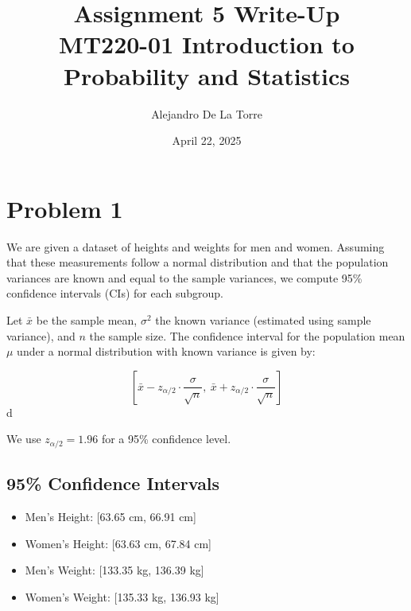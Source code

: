 \documentclass[12pt]{article}
\title{Assignment 5 Write-Up \\ MT220-01 Introduction to Probability and Statistics}
\author{Alejandro De La Torre}
\date{April 22, 2025}
\begin{document}
\maketitle

\section*{Problem 1}

We are given a dataset of heights and weights for men and women. Assuming that these measurements follow a normal distribution and that the population variances are known and equal to the sample variances, we compute 95\% confidence intervals (CIs) for each subgroup.

Let $\bar{x}$ be the sample mean, $\sigma^2$ the known variance (estimated using sample variance), and $n$ the sample size. The confidence interval for the population mean $\mu$ under a normal distribution with known variance is given by:

\[
\left[ \bar{x} - z_{\alpha/2} \cdot \frac{\sigma}{\sqrt{n}},\ \bar{x} + z_{\alpha/2} \cdot \frac{\sigma}{\sqrt{n}} \right]
\]d

We use $z_{\alpha/2} = 1.96$ for a 95\% confidence level.

\vspace{1em}
\subsection*{95\% Confidence Intervals}
\begin{itemize}
  \item Men's Height: [63.65 cm, 66.91 cm]
  \item Women's Height: [63.63 cm, 67.84 cm]
  \item Men's Weight: [133.35 kg, 136.39 kg]
  \item Women's Weight: [135.33 kg, 136.93 kg]

\end{itemize}
\end{document}

